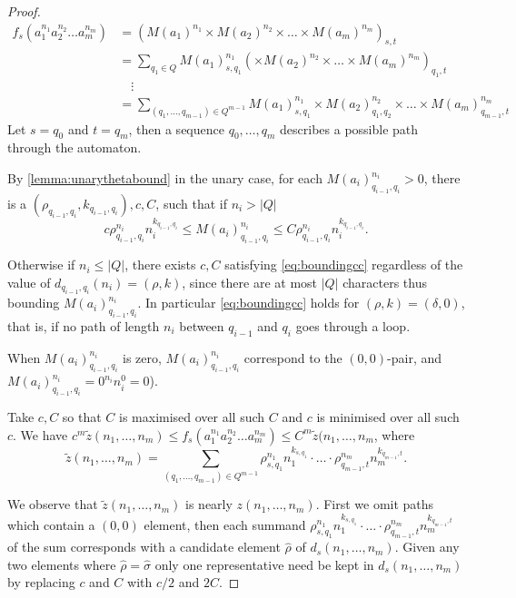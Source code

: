 \documentclass[10pt,a4paper]{amsart}
\numberwithin{equation}{section}
\theoremstyle{plain}
\theoremstyle{definition}
\theoremstyle{remark}
\newcommand\dgf{d}
\renewcommand\nu{f}
\begin{document}
\begin{proof}

\begin{align*}
\nu_s(a_1^{n_1}a_2^{n_2}\dots a_m^{n_m}) &=  (M(a_1)^{n_1}\times M(a_2)^{n_2}\times \dots \times M(a_m)^{n_m})_{s,t}
\\ &= \sum_{q_1 \in Q} M(a_1)^{n_1}_{s,q_1}(\times M(a_2)^{n_2}\times \dots \times M(a_m)^{n_m})_{q_1,t}
\\ & \quad \vdots
\\ &= \sum_{(q_1,\dots,q_{m-1})\in Q^{m-1}} M(a_1)^{n_1}_{s,q_1}\times M(a_2)^{n_2}_{q_1,q_2}\times \dots \times M(a_m)^{n_m}_{q_{m-1},t}
\end{align*}
Let $s = q_0$ and $t = q_m$, then a sequence $q_0,\dots,q_m$ describes a possible path through the automaton.

By \cref{lemma:unarythetabound} in the unary case, for each $M(a_i)^{n_i}_{q_{i-1},q_i} >0$, there is a $(\rho_{q_{i-1},q_i},k_{q_{i-1},q_i}),c,C$, such that if $n_i > |Q|$ \begin{equation}\label{eq:boundingcc}c\rho_{q_{i-1},q_i}^{n_i}n_i^{k_{q_{i-1},q_i}} \le M(a_i)^{n_i}_{q_{i-1},q_i} \le C \rho_{q_{i-1},q_i}^{n_i}n_i^{k_{q_{i-1},q_i}}.\end{equation}

Otherwise if $n_i \le |Q|$, there exists $c,C$ satisfying \cref{eq:boundingcc} regardless of the value of $\dgf_{q_{i-1},q_i}(n_i) = (\rho,k)$, since there are at most $|Q|$ characters thus bounding $M(a_i)^{n_i}_{q_{i-1},q_i}$. In particular \cref{eq:boundingcc} holds for $(\rho,k) = (\delta,0)$, that is, if no path of length $n_i$ between $q_{i-1}$ and $q_i$ goes through a loop.

When $M(a_i)^{n_i}_{q_{i-1},q_i}$ is zero, $M(a_i)^{n_i}_{q_{i-1},q_i}$ correspond to the $(0,0)$-pair, and $M(a_i)^{n_i}_{q_{i-1},q_i} = 0^{n_i}n_i^{0} = 0$).

Take $c,C$ so that $C$ is maximised over all such $C$ and $c$ is minimised over all such $c$. We have  $
c^{m} \tilde{z}(n_1,\dots,n_m)  \le \nu_s(a_1^{n_1}a_2^{n_2}\dots a_m^{n_m}) \le  C^{m}\tilde{z}(n_1,\dots,n_m $, where
\[
\tilde{z}(n_1,\dots,n_m) = \sum_{(q_1,\dots,q_{m-1})\in Q^{m-1}} \rho_{s,q_1}^{n_1}n_1^{k_{s,q_1}}
\cdot \ldots \cdot \rho_{q_{m-1},t}^{n_m}n_m^{k_{q_{m-1},t}}.
\]

We observe that $\tilde{z}(n_1,\dots,n_m)$ is nearly $z(n_1,\dots,n_m)$.  First we omit paths which contain a $(0,0)$ element, then each summand $\rho_{s,q_1}^{n_1}n_1^{k_{s,q_1}}\cdot
\ldots \cdot \rho_{q_{m-1},t}^{n_m}n_m^{k_{q_{m-1},t}}$ of the sum corresponds with a candidate element $\hat{\rho}$ of $\dgf_s(n_1,\dots,n_m)$.
Given any two elements where $\hat{\rho}= \hat{\sigma}$ only one representative need be kept in $\dgf_s(n_1,\dots,n_m)$ by replacing $c$ and $C$ with $c/2$ and $2C$.


\end{proof}
\end{document}
